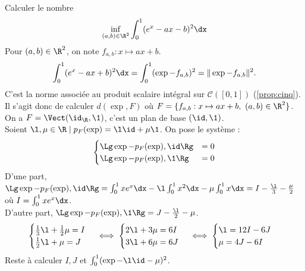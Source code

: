 \documentclass[11pt]{article}
\renewcommand*{\C}{\mathcal{C}}
\begin{document}
\begin{ex}{}{}
    Calculer le nombre
    \begin{equation*}
        \inf_{(a,b)\in \R^2}\int_0^1(e^x-ax-b)^2\dx
    \end{equation*}
    \tcblower
    Pour $(a,b)\in\R^2$, on note $f_{a,b}:x\mapsto ax + b$.
    \begin{equation*}
        \int_0^1(e^x-ax+b)^2\dx=\int_0^1(\exp - f_{a,b})^2=\|\exp - f_{a,b}\|^2.
    \end{equation*}    
    C'est la norme associée au produit scalaire intégral sur $\C([0,1])$ (\ref{prop:cinq}).\\
    Il s'agit donc de calculer $d(\exp, F)$ où $F=\{f_{a,b}:x\mapsto ax+b, ~ (a,b)\in\R^2\}$.\\
    On a $F=\Vect(\id_\R, \1)$, c'est un plan de base $(\id,\1)$.\\
    Soient $\l,\mu\in\R\mid p_F(\exp)=\l \id + \mu\1$. On pose le système :
    \begin{equation*}
        \begin{cases}
            \Lg \exp-p_F(\exp), \id\Rg &= 0\\
            \Lg \exp-p_F(\exp), \1\Rg &= 0
        \end{cases}
    \end{equation*}
    D'une part, $\Lg \exp - p_F(\exp), \id\Rg = \int_0^1xe^x\dx - \l\int_0^1x^2\dx - \mu \int_0^1 x\dx= I - \frac{\l}{3}-\frac{\mu}{2}$ où $I=\int_0^1xe^x\dx$.\\
    D'autre part, $\Lg \exp - p_F(\exp),\1\Rg = J - \frac{\l}{2}-\mu$.
    \begin{equation*}
        \begin{cases}
            \frac{1}{3}\l + \frac{1}{2}\mu = I\\
            \frac{1}{2}\l + \mu = J
        \end{cases}
        \iff 
        \begin{cases}
            2\l + 3\mu = 6I\\
            3\l + 6\mu = 6J
        \end{cases}
        \iff
        \begin{cases}
            \l = 12I - 6J\\
            \mu = 4J - 6I
        \end{cases}
    \end{equation*}
    Reste à calculer $I,J$ et $\int_0^1(\exp-\l\id - \mu)^2$.
\end{ex}
\end{document}
